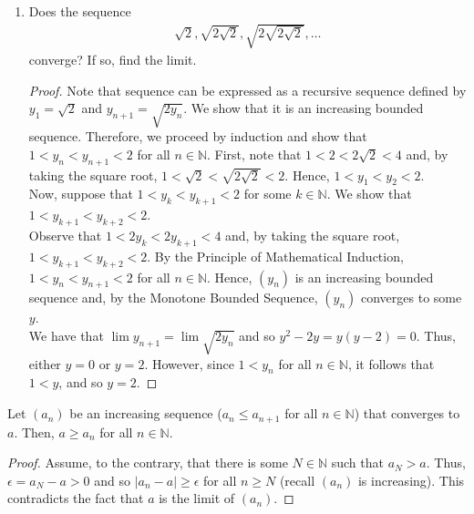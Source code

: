 \documentclass[12pt]{article}
\newcommand{\N}{\mathbb{N}}
\newenvironment{lemma}[2][Lemma]{\begin{trivlist} \item[\hskip \labelsep {\bfseries #1}\hskip \labelsep {\bfseries #2.}]}{\end{trivlist}}
\newenvironment{problem}[2][Problem]{\begin{trivlist} \item[\hskip \labelsep {\bfseries #1}\hskip \labelsep {\bfseries #2.}]}{\end{trivlist}}
\begin{document}
\begin{problem}{2.4.3}
\begin{enumerate}
\begin{proof}
Now, we proceed to find its limit. Note that $\lim (y_{n+1}) = \lim (y_{n}) = y$ and so
\begin{align*}
  \lim{y_{n+1}} &= \sqrt{2+y} \implies\\
  y^{2} -y -2 &= 0 
\end{align*}
Thus, $(y-2)^{2}=0$ and so $y=2$.
\end{proof}
\item Does the sequence  
\begin{align*}
  \sqrt{2},\sqrt{2\sqrt{2}},\sqrt{2\sqrt{2\sqrt{2}}},\dots
\end{align*}
converge? If so, find the limit.
\begin{proof}
  Note that sequence can be expressed as a recursive sequence defined by $y_{1} = \sqrt{2}$ and $y_{n+1} = \sqrt{2y_{n}}$. We show that it is an increasing bounded sequence. Therefore, we proceed by induction and show that $1<y_{n}<y_{n+1}<2$ for all $n\in \N$. First, note that $1<2<2\sqrt{2}<4$ and, by taking the square root, $1<\sqrt{2}<\sqrt{2\sqrt{2}}<2$. Hence, $1<y_{1}<y_{2}<2$.\\
  Now, suppose that $1<y_{k}<y_{k+1}<2$ for some $k\in\N$. We show that $1<y_{k+1}<y_{k+2}<2$.\\
  Observe that $1<2y_{k}<2y_{k+1}<4$ and, by taking the square root, $1<y_{k+1}<y_{k+2}<2$. By the Principle of Mathematical Induction, $1<y_{n}<y_{n+1}<2$ for all $n\in \N$. Hence, $(y_{n})$ is an increasing bounded sequence and, by the Monotone Bounded Sequence, $(y_{n})$ converges to some $y$.\\
  We have that $\lim y_{n+1} = \lim \sqrt{2y_{n}}$ and so $y^{2}-2y = y(y-2)=0$. Thus, either $y=0$ or $y=2$. However, since $1<y_{n}$ for all $n\in\N$, it follows that $1<y$, and so $y=2$. 
\end{proof}
\end{enumerate}
\end{problem}
\begin{lemma}{1}
  Let $(a_{n})$ be an increasing sequence ($a_{n}\leq a_{n+1}$ for all $n\in  \N$) that converges to $a$. Then, $a\geq a_{n}$ for all $n\in \N$.
\begin{proof}
  Assume, to the contrary, that there is some $N\in\N$ such that $a_{N}>a$. Thus, $\epsilon = a_{N}-a>0$ and so $|a_{n}-a|\geq\epsilon$ for all $n\geq N$ (recall $(a_{n})$ is increasing). This contradicts the fact that $a$ is the limit of $(a_{n})$.
\end{proof}
\end{lemma}
\end{document}
